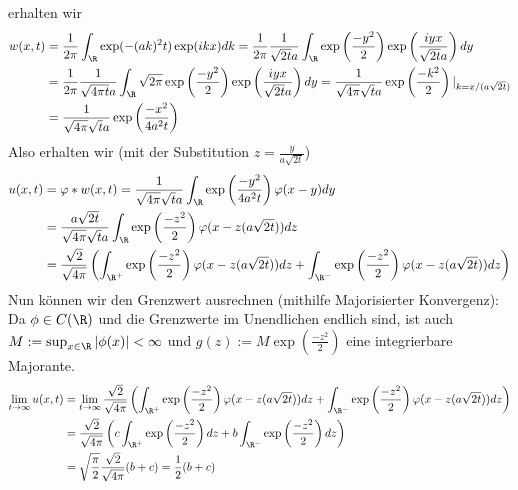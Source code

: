 \begin{solution}
erhalten wir
\begin{align*}
  w(x,t) &= \frac{1}{2\pi}\int_\R \exp(-(ak)^2t)\exp(ikx) dk
  = \frac{1}{2\pi}\frac{1}{\sqrt{2t}a}\int_\R \exp\left(\frac{-y^2}{2}\right)
  \exp\left(\frac{iyx}{\sqrt{2t}a}\right) dy \\
  &= \frac{1}{2\pi}\frac{1}{\sqrt{4\pi t}a}\int_\R \sqrt{2\pi}\exp\left(\frac{-y^2}{2}\right)
  \exp\left(\frac{iyx}{\sqrt{2t}a}\right) dy
  = \frac{1}{\sqrt{4\pi} \sqrt{t}a}\exp\left(\frac{-k^2}{2}\right)|_{k = x/(a \sqrt{2t})} \\
  &= \frac{1}{\sqrt{4\pi} \sqrt{t}a}\exp\left(\frac{-x^2}{4a^2 t}\right)
\end{align*}
Also erhalten wir (mit der Substitution $z = \frac{y}{a \sqrt{2t}}$)
\begin{align*}
  u(x,t) &= \varphi \ast w (x,t) =
  \frac{1}{\sqrt{4\pi} \sqrt{t}a} \int_\R \exp\left(\frac{-y^2}{4a^2 t}\right)\varphi(x-y) dy \\
  &= \frac{a \sqrt{2t}}{\sqrt{4\pi} \sqrt{t}a} \int_\R \exp\left(\frac{-z^2}{2}\right)\varphi(x-z(a \sqrt{2t})) dz \\
  &= \frac{\sqrt{2}}{\sqrt{4\pi}} \left(\int_{\R^{+}} \exp\left(\frac{-z^2}{2}\right)\varphi(x-z(a \sqrt{2t})) dz + \int_{\R^{-}} \exp\left(\frac{-z^2}{2}\right)\varphi(x-z(a \sqrt{2t})) dz \right)
\end{align*}
Nun können wir den Grenzwert ausrechnen (mithilfe Majorisierter Konvergenz): \\
Da $\phi \in C(\R)$ und die Grenzwerte im Unendlichen endlich sind, ist auch
$M := \sup_{x\in\R}|\phi(x)| < \infty$ und $g(z) := M\exp\left(\frac{-z^2}{2}\right)$
eine integrierbare Majorante.
\begin{align*}
  \lim_{t \to \infty} u(x,t) &= \lim_{t \to \infty}
  \frac{\sqrt{2}}{\sqrt{4\pi}} \left(\int_{\R^{+}} \exp\left(\frac{-z^2}{2}\right)\varphi(x-z(a \sqrt{2t})) dz + \int_{\R^{-}} \exp\left(\frac{-z^2}{2}\right)\varphi(x-z(a \sqrt{2t})) dz \right) \\
  &= \frac{\sqrt{2}}{\sqrt{4\pi}} \left(c\int_{\R^{+}} \exp\left(\frac{-z^2}{2}\right) dz + b\int_{\R^{-}} \exp\left(\frac{-z^2}{2}\right) dz \right) \\
  &= \sqrt{\frac{\pi}{2}} \frac{\sqrt{2}}{\sqrt{4\pi}} (b+c) = \frac{1}{2} (b+c)
\end{align*}
\end{solution}

